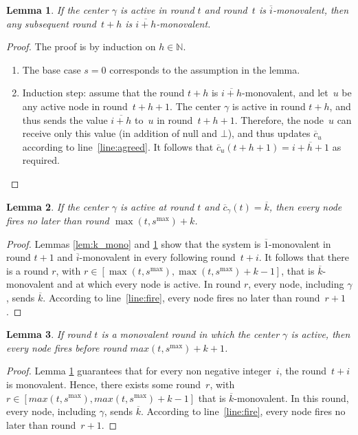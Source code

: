 \documentclass{article}
\newtheorem{lemma}{Lemma}[section]
\newcommand{\cent}{\gamma}
\begin{document}
\begin{lemma}\label{lem:mono_mono}
	If the center $\cent$ is active in round $t$  and round~$t$ is $\overline{i}$-monovalent, 
	then any subsequent round~$ t + h$ is $\overline{i+ h}$-monovalent.
\end{lemma}

\begin{proof}
The proof is by induction on $h \in \mathds{N}$.
\begin{enumerate}
	\item The base case $s=0$ corresponds to the assumption in the lemma.
	\item Induction step:  assume that the round $t+h$ is $\overline{i+h}$-monovalent,
			 and let~$u$ be  any active node in round~$t+h+1$.
			The center $\cent$ is active in round $t +h$, and thus sends the value $\overline{i+h}$ to~$u$
				in round~$ t+h+1$.
			Therefore, the node~$u$ can receive only this value (in addition of null and $\bot$), and thus updates
				$\overline{c}_u$ according to line~\ref{line:agreed}. 
			It follows that $ \overline{c}_u(t+h+1) = \overline{i+h+1}$ as required.
\end{enumerate}
\end{proof}

\begin{lemma}\label{lem:k_liv}
If the center $\cent$ is active at round $t$  and $\overline{c}_\cent(t) = \overline{k} $, 
	then every node fires no later than round $\max(t, s^{\max}) + k $.
\end{lemma}
\begin{proof}
Lemmas \ref{lem:k_mono} and \ref{lem:mono_mono} show that the system is $\overline{1}$-monovalent in round $t+1$
	and $\overline{i}$-monovalent in every  following round~$t+i$.
It follows that there is a round $r$, with $r \in [ \max ( t, s^{\max} )  , \max (t , s^{\max} ) + k  - 1] $,
	that  is $\overline{k}$-monovalent and at which every node is active.
In round $r$, every node, including $\cent$, sends $ \overline{k} $.
According to line~\ref{line:fire}, every node fires no later than round~$r+1$.
\end{proof}
 
\begin{lemma}\label{lem:mono_liv}
If  round $t$ is a monovalent round in which the center $\cent$ is active, then 
	every node fires before round $max( t, s^{\max} )+k + 1$.
\end{lemma}
\begin{proof}
Lemma \ref{lem:mono_mono} guarantees that for every non negative integer~$i$,
	the round~$t +i$ is monovalent.   
Hence, there exists some round~$r$, with $r \in [ max( t, s^{\max} ) , max( t, s^{\max} )+ k - 1 ] $ 
	that is  $\overline{k}$-monovalent.
In this round, every node, including $\cent$, sends $\overline{k}$.
According to line~\ref{line:fire}, every node fires no later than round~$r+1$.
\end{proof}
\end{document}
